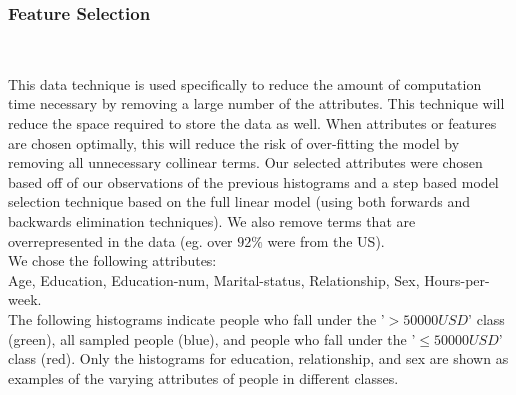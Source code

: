 \documentclass{article}
\begin{document}
		\subsubsection{Feature Selection}~

		This data technique is used specifically to reduce the amount of computation time necessary by removing a large number of the attributes. This technique will reduce the space required to store the data as well. When attributes or features are chosen optimally, this will reduce the risk of over-fitting the model by removing all unnecessary collinear terms. Our selected attributes were chosen based off of our observations of the previous histograms and a step based model selection technique based on the full linear model (using both forwards and backwards elimination techniques). We also remove terms that are overrepresented in the data (eg. over $ 92\% $ were from the US). \\
		
		We chose the following attributes:\\ Age, Education, Education-num, Marital-status, Relationship, Sex, Hours-per-week.\\
		
		The following histograms indicate people who fall under the '$>50000 USD$' class (green), all sampled people (blue), and people who fall under the '$\le50000 USD$' class (red). Only the histograms for education, relationship, and sex are shown as examples of the varying attributes of people in different classes.
		
\end{document}
